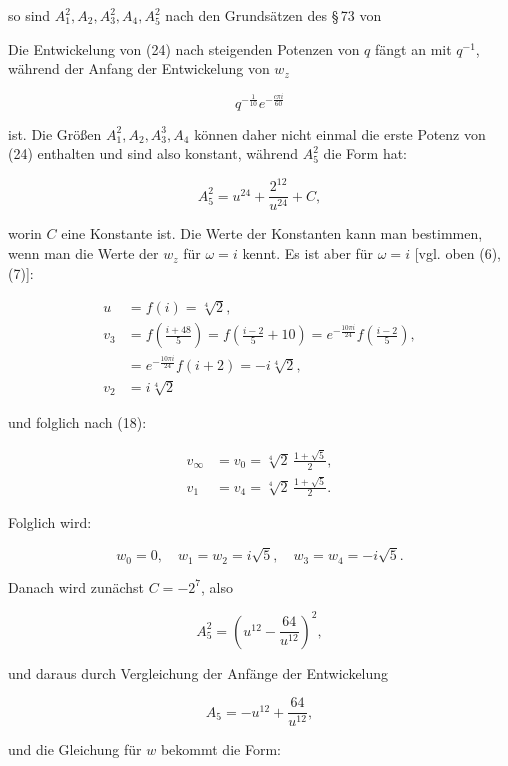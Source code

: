 so sind $A_1^2, A_2, A_3^2, A_4, A_5^2$ nach den Grundsätzen des §\,73
 von


Die Entwickelung von (24) nach steigenden Potenzen von $q$ fängt an mit
$q^{-1}$, während der Anfang der Entwickelung von $w_z$

\[
q^{-\frac{1}{10}}e^{-\frac{c\pi i}{60}}
\]

ist. Die Größen $A_1^2, A_2, A_3^3, A_4$ können %
 daher nicht einmal die
erste Potenz von (24) enthalten und sind also konstant, während $A_5^2$
die Form hat:

\[
A_5^2 = u^{24} + \frac{2^{12}}{u^{24}} + C,
\]

worin $C$ eine Konstante ist. Die Werte der Konstanten kann man
bestimmen, wenn man die Werte der $w_z$ für $\omega = i$ kennt. Es ist
aber für $\omega = i$ [vgl. oben (6), (7)]:

\[
\begin{aligned}
u &= f(i) = \sqrt[4]{2},\\
v_3 &= f\left(\frac{i+48}{5}\right) = f\left(\frac{i-2}{5}+10\right) = e^{-\frac{10\pi i}{24}}f\left(\frac{i-2}{5}\right),\\
&= e^{-\frac{10\pi i}{24}}f(i+2) = -i\sqrt[4]{2},\\
v_2 &= i\sqrt[4]{2}
\end{aligned}
\]

und folglich nach (18):

\[
\begin{aligned}
v_\infty &= v_0 = \sqrt[4]{2}\,\frac{1+\sqrt{5}}{2},\\
v_1 &= v_4 = \sqrt[4]{2}\,\frac{1+\sqrt{5}}{2}. %
\end{aligned}
\]

Folglich wird:

\[
w_0 = 0, \quad w_1 = w_2 = i\sqrt{5}, \quad w_3 = w_4 = -i\sqrt{5}.
\]

Danach wird zunächst $C = -2^7$, also

\[
A_5^2 = \left(u^{12} - \frac{64}{u^{12}}\right)^2,
\]

und daraus durch Vergleichung der Anfänge der Entwickelung

\[
A_5 = -u^{12} + \frac{64}{u^{12}},
\]

und die Gleichung für $w$ bekommt die Form:

